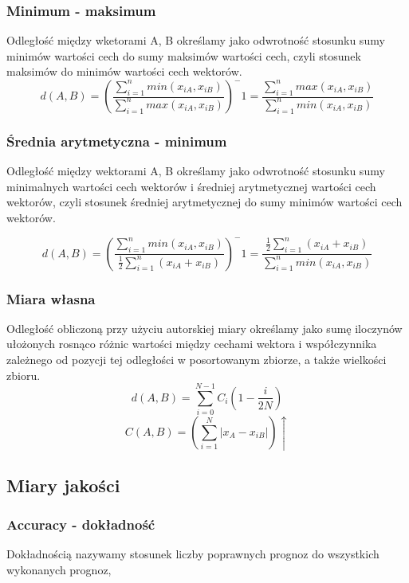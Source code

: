 \documentclass{classrep}
\begin{document}
\subsubsection{Minimum - maksimum}
Odległość między wketorami A, B określamy jako odwrotność stosunku sumy minimów wartości cech do sumy maksimów wartości cech, czyli stosunek maksimów do minimów wartości cech wektorów.
\begin{equation}
d(A, B) = (\frac{\sum_{i=1}^n{min(x_{iA}, x_{iB})}}{\sum_{i=1}^n{max(x_{iA}, x_{iB})}})^-1 = \frac{\sum_{i=1}^n{max(x_{iA}, x_{iB})}}{\sum_{i=1}^n{min(x_{iA}, x_{iB})}}
\end{equation}

\subsubsection{Średnia arytmetyczna - minimum}
Odległość między wektorami A, B określamy jako odwrotność stosunku sumy minimalnych wartości cech wektorów i średniej arytmetycznej wartości cech wektorów, czyli stosunek średniej arytmetycznej do sumy minimów wartości cech wektorów.

\begin{equation}
d(A, B) =  (\frac{\sum_{i=1}^n{min(x_{iA}, x_{iB})}}{\frac{1}{2}\sum_{i=1}^n({x_{iA} + x_{iB}})})^-1 = \frac{\frac{1}{2}\sum_{i=1}^n({x_{iA} + x_{iB}})}{\sum_{i=1}^n{min(x_{iA}, x_{iB})}}
\end{equation}
\subsubsection{Miara własna}
Odległość obliczoną przy użyciu autorskiej miary określamy jako sumę iloczynów ułożonych rosnąco różnic wartości między cechami wektora i współczynnika zależnego od pozycji tej odległości w posortowanym zbiorze, a także wielkości zbioru.
\begin{equation}
d(A, B) =  \sum_{i=0}^{N-1}C_i(1 - \frac{i}{2N})
\end{equation}
\begin{equation}
C(A,B) =  (\sum_{i=1}^N|x_{A} - x_{iB}|)\uparrow
\end{equation}

\subsection{Miary jakości}
\subsubsection{Accuracy - dokładność}
Dokładnością nazywamy stosunek liczby poprawnych prognoz do wszystkich wykonanych prognoz,
\end{document}
